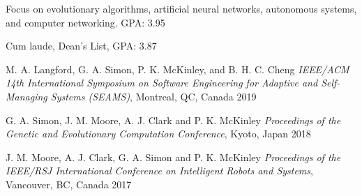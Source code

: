 \documentclass[
	a4paper,
]{fortysecondscv}
\begin{document}
\begin{cvtable}[1.5]
		{Focus on evolutionary algorithms, artificial neural networks, autonomous systems, and computer networking. GPA: 3.95}
		
		{Cum laude, Dean's List, GPA: 3.87}
\end{cvtable}


\begin{cvtable}
\end{cvtable}


\begin{cvtable}
    	{M. A. Langford, G. A. Simon, P. K. McKinley, and B. H. C. Cheng}
    	{\textit{IEEE/ACM 14th International Symposium on Software Engineering for Adaptive and Self-Managing Systems (SEAMS)}, Montreal, QC, Canada}
    	{2019}
	
    	{G. A. Simon, J. M. Moore, A. J. Clark and P. K. McKinley}
    	{\textit{Proceedings of the Genetic and Evolutionary Computation Conference}, Kyoto, Japan}
    	{2018}
	
    	{J. M. Moore, A. J. Clark, G. A. Simon and P. K. McKinley}
    	{\textit{Proceedings of the IEEE/RSJ International Conference on Intelligent Robots and Systems}, Vancouver, BC, Canada}
    	{2017}
\end{cvtable}
\end{document}
